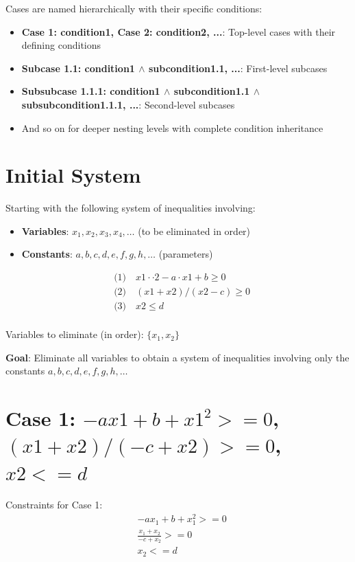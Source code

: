 \documentclass{article}
\begin{document}
Cases are named hierarchically with their specific conditions:
\begin{itemize}
\item \textbf{Case 1: condition1, Case 2: condition2, ...}: Top-level cases with their defining conditions
\item \textbf{Subcase 1.1: condition1 $\wedge$ subcondition1.1, ...}: First-level subcases
\item \textbf{Subsubcase 1.1.1: condition1 $\wedge$ subcondition1.1 $\wedge$ subsubcondition1.1.1, ...}: Second-level subcases
\item And so on for deeper nesting levels with complete condition inheritance
\end{itemize}

\section{Initial System}

Starting with the following system of inequalities involving:
\begin{itemize}
\item \textbf{Variables}: $x_1, x_2, x_3, x_4, \ldots$ (to be eliminated in order)
\item \textbf{Constants}: $a, b, c, d, e, f, g, h, \ldots$ (parameters)
\end{itemize}

\begin{align}
& \text{(1)} \quad x1 \cdot  \cdot 2 - a \cdot x1 + b \geq 0 \\
& \text{(2)} \quad (x1 + x2)/(x2 - c) \geq 0 \\
& \text{(3)} \quad x2 \leq d \\
\end{align}

Variables to eliminate (in order): $\{x_{1}, x_{2}\}$

\textbf{Goal}: Eliminate all variables to obtain a system of inequalities
involving only the constants $a, b, c, d, e, f, g, h, \ldots$

\section{Case 1: $-a x1 + b + x1^2 >= 0$, $(x1 + x2)/(-c + x2) >= 0$, $x2 <= d$}

Constraints for Case 1:
\begin{align}
& - a x_{1} + b + x_{1}^{2} >= 0 \\
& \frac{x_{1} + x_{2}}{- c + x_{2}} >= 0 \\
& x_{2} <= d \\
\end{align}
\end{document}
